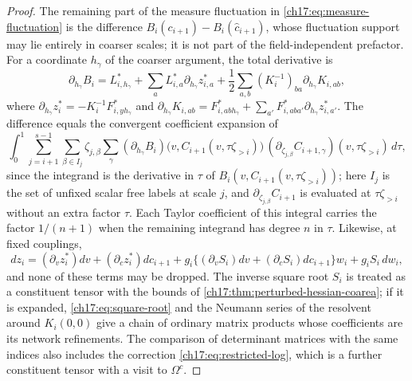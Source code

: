 \begin{proof}
The remaining part of the measure fluctuation in \eqref{ch17:eq:measure-fluctuation} is the difference $B_i(c_{i+1})-B_i(\widehat c_{i+1})$, whose fluctuation support may lie entirely in coarser scales; it is not part of the field-independent prefactor. For a coordinate $h_\gamma$ of the coarser argument, the total derivative is
\[
 \partial_{h_\gamma}B_i=L_{i,h_\gamma}^*+\sum_aL_{i,a}^*\partial_{h_\gamma}z_{i,a}^*+\frac12\sum_{a,b}(K_i^{-1})_{ba}\partial_{h_\gamma}K_{i,ab},
\]
where $\partial_{h_\gamma}z_i^*=-K_i^{-1}F_{i,yh_\gamma}^*$ and $\partial_{h_\gamma}K_{i,ab}=F_{i,abh_\gamma}^*+\sum_{a'}F_{i,aba'}^*\partial_{h_\gamma}z_{i,a'}^*$. The difference equals the convergent coefficient expansion of
\[
 \int_0^1\sum_{j=i+1}^{s-1}\sum_{\beta\in I_j}\zeta_{j,\beta}\sum_\gamma(\partial_{h_\gamma}B_i)\bigl(v,C_{i+1}(v,\tau\zeta_{>i})\bigr)\,(\partial_{\zeta_{j,\beta}}C_{i+1,\gamma})(v,\tau\zeta_{>i})\,d\tau,
\]
since the integrand is the derivative in $\tau$ of $B_i(v,C_{i+1}(v,\tau\zeta_{>i}))$; here $I_j$ is the set of unfixed scalar free labels at scale $j$, and $\partial_{\zeta_{j,\beta}}C_{i+1}$ is evaluated at $\tau\zeta_{>i}$ without an extra factor $\tau$. Each Taylor coefficient of this integral carries the factor $1/(n+1)$ when the remaining integrand has degree $n$ in $\tau$. Likewise, at fixed couplings,
\[
 dz_i=(\partial_vz_i^*)dv+(\partial_cz_i^*)dc_{i+1}+g_i\{(\partial_vS_i)dv+(\partial_cS_i)dc_{i+1}\}w_i+g_iS_i\,dw_i,
\]
and none of these terms may be dropped. The inverse square root $S_i$ is treated as a constituent tensor with the bounds of \cref{ch17:thm:perturbed-hessian-coarea}; if it is expanded, \eqref{ch17:eq:square-root} and the Neumann series of the resolvent around $K_i(0,0)$ give a chain of ordinary matrix products whose coefficients are its network refinements. The comparison of determinant matrices with the same indices also includes the correction \eqref{ch17:eq:restricted-log}, which is a further constituent tensor with a visit to $\Omega^c$.


\end{proof}
